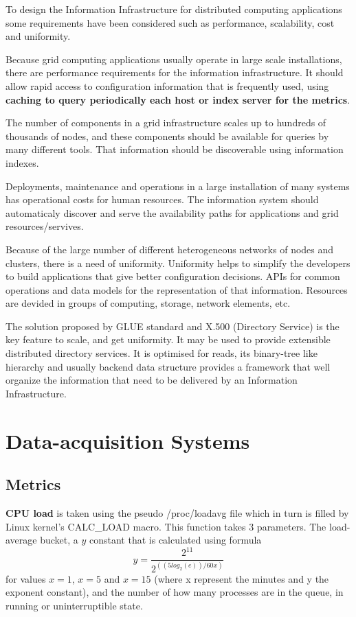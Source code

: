 To design the Information Infrastructure for distributed computing applications some requirements have been considered such as performance, scalability, cost and uniformity.

Because grid computing applications usually operate in large scale installations, there are performance requirements for the information infrastructure. It should allow rapid access to configuration information that is frequently used, using {\bf caching to query periodically each host or index server for the metrics}.

The number of components in a grid infrastructure scales up to hundreds of thousands of nodes, and these components should be available for queries by many different tools. That information should be discoverable using information indexes.

Deployments, maintenance and operations in a large installation of many systems has operational costs for human resources. The information system should automaticaly discover and serve the availability paths for applications and grid resources/servives.

Because of the large number of different heterogeneous networks of nodes and clusters, there is a need of uniformity. Uniformity helps to simplify the developers to build applications that give better configuration decisions. APIs for common operations and data models for the representation of that information. Resources are devided in groups of computing, storage, network elements, etc.

The solution proposed by GLUE standard and X.500 (Directory Service) is the key feature to scale, and get uniformity. It may be used to provide extensible distributed directory services. It is optimised for reads, its binary-tree like hierarchy and usually backend data structure provides a framework that well organize the information that need to be delivered by an Information Infrastructure.\cite{mds1}

\section{Data-acquisition Systems}

\subsection{Metrics}\label{subsec:metrics}

{\bf CPU load} is taken using the pseudo /proc/loadavg file which in turn is
filled by Linux kernel's CALC\_LOAD macro. This function takes 3 parameters.
The load-average bucket, a $y$ constant that is calculated using formula
\[
y=\frac{2^{11}}{2^{((5log_2(e))/60x)}}
\]
for values $x=1$, $x=5$ and $x=15$ (where x represent the minutes and y the
exponent constant), and the number of how many processes are in the queue, in
running or uninterruptible state.

